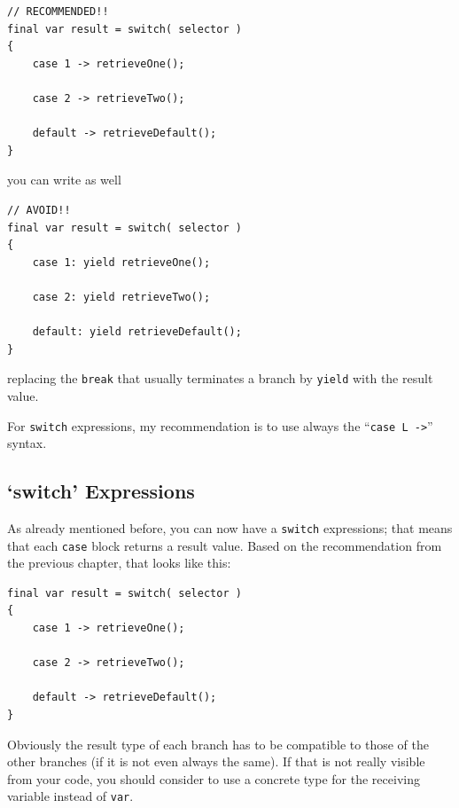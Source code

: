 \begin{lstlisting}
// RECOMMENDED!!
final var result = switch( selector )
{
    case 1 -> retrieveOne();
    
    case 2 -> retrieveTwo();
    
    default -> retrieveDefault();
}
\end{lstlisting}

you can write as well
\begin{lstlisting}
// AVOID!!
final var result = switch( selector )
{
    case 1: yield retrieveOne();
    
    case 2: yield retrieveTwo();
    
    default: yield retrieveDefault();
}
\end{lstlisting}

replacing the \lstinline|break| that usually terminates a branch by \lstinline|yield| with the result value.

For \lstinline|switch| expressions, my recommendation is to use always the “\verb#case L ->#” syntax.


\subsection{‘switch’ Expressions}
As already mentioned before, you can now have a \lstinline|switch| expressions\autocite{ORACLE_DOC_LANGUAGE_SPECIFICATION:SwitchExpression, ORACLE_DOC_LANGUAGE_SPECIFICATION:SwitchExpressionBlock, ORACLE_DOC_SWITCHEXPRESSIONS}; that means that each \lstinline|case| block returns a result value. Based on the recommendation from the previous chapter, that looks like this:
\begin{lstlisting}
final var result = switch( selector )
{
    case 1 -> retrieveOne();
    
    case 2 -> retrieveTwo();
    
    default -> retrieveDefault();
}
\end{lstlisting}

Obviously the result type of each branch has to be compatible to those of the other branches (if it is not even always the same). If that is not really visible from your code, you should consider to use a concrete type for the receiving variable instead of \lstinline|var|. 

\hrulefill\newpage 

